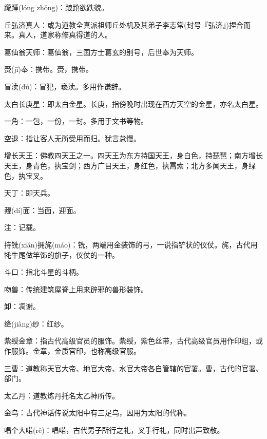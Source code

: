 \startbuffer[176]
躘踵(lóng zhǒng)：踉跄欲跌貌。
\stopbuffer


\startbuffer[177]
丘弘济真人：或为道教全真派祖师丘处机及其弟子李志常(封号『弘济』)捏合而来。真人，道家称修真得道的人。
\stopbuffer


\startbuffer[178]
葛仙翁天师：葛仙翁，三国方士葛玄的别号，后世奉为天师。
\stopbuffer


\startbuffer[179]
赍(jī)奉：携带。赍，携带。
\stopbuffer


\startbuffer[180]
冒渎(dú)：冒犯，亵渎。多用作谦辞。
\stopbuffer


\startbuffer[181]
太白长庚星：即太白金星。长庚，指傍晚时出现在西方天空的金星，亦名太白星。
\stopbuffer


\startbuffer[182]
一角：一包，一份，一封。多用于文书等物。
\stopbuffer


\startbuffer[183]
空退：指让客人无所受用而归。犹言怠慢。
\stopbuffer


\startbuffer[184]
增长天王：佛教四天王之一。四天王为东方持国天王，身白色，持琵琶；南方增长天王，身青色，执宝剑；西方广目天王，身红色，执罥索；北方多闻天王，身绿色，执宝叉。
\stopbuffer


\startbuffer[185]
天丁：即天兵。
\stopbuffer


\startbuffer[186]
觌(dí)面：当面，迎面。
\stopbuffer


\startbuffer[187]
注：记载。
\stopbuffer


\startbuffer[188]
持铣(xiǎn)拥旄(máo)：铣，两端用金装饰的弓，一说指铲状的仪仗。旄，古代用牦牛尾做竿饰的旗子，仪仗的一种。
\stopbuffer


\startbuffer[189]
斗口：指北斗星的斗柄。
\stopbuffer


\startbuffer[190]
吻兽：传统建筑屋脊上用来辟邪的兽形装饰。
\stopbuffer


\startbuffer[191]
卸：凋谢。
\stopbuffer


\startbuffer[192]
绛(jiàng)纱：红纱。
\stopbuffer


\startbuffer[193]
紫绶金章：指古代高级官员的服饰。紫绶，紫色丝带，古代高级官员用作印组，或作服饰。金章，金质官印，也称高级官服。
\stopbuffer


\startbuffer[194]
三曹：道教称天官大帝、地官大帝、水官大帝各自管辖的官署。曹，古代的官署、部门。
\stopbuffer


\startbuffer[195]
太乙丹：道教炼丹托名太乙神所传。
\stopbuffer


\startbuffer[196]
金乌：古代神话传说太阳中有三足乌，因用为太阳的代称。
\stopbuffer


\startbuffer[197]
唱个大喏(rě)：唱喏，古代男子所行之礼，叉手行礼，同时出声致敬。
\stopbuffer


